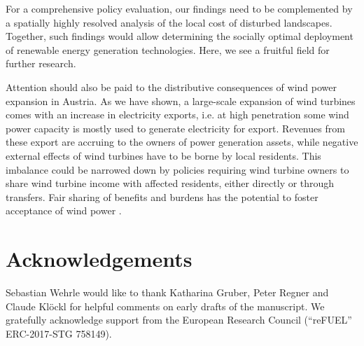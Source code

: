 \documentclass[review, 3p, times, 12pt, authoryear]{elsarticle}
\begin{document}
    For a comprehensive policy evaluation, our findings need to be complemented by a spatially highly resolved analysis of the local cost of disturbed landscapes.
    Together, such findings would allow determining the socially optimal deployment of renewable energy generation technologies.
    Here, we see a fruitful field for further research.

    Attention should also be paid to the distributive consequences of wind power expansion in Austria.
    As we have shown, a large-scale expansion of wind turbines comes with an increase in electricity exports, i.e. at high penetration some wind power capacity is mostly used to generate electricity for export.
    Revenues from these export are accruing to the owners of power generation assets, while negative external effects of wind turbines have to be borne by local residents.
    This imbalance could be narrowed down by policies requiring wind turbine owners to share wind turbine income with affected residents, either directly or through transfers.
    Fair sharing of benefits and burdens has the potential to foster acceptance of wind power \citep{Scherhaufer2017}.

    \section*{Acknowledgements}
    Sebastian Wehrle would like to thank Katharina Gruber, Peter Regner and Claude Klöckl for helpful comments on early drafts of the manuscript.
    We gratefully acknowledge support from the European Research Council (“reFUEL” ERC-2017-STG 758149).

    \newpage
    
    

    \newpage
    \appendix
\end{document}
